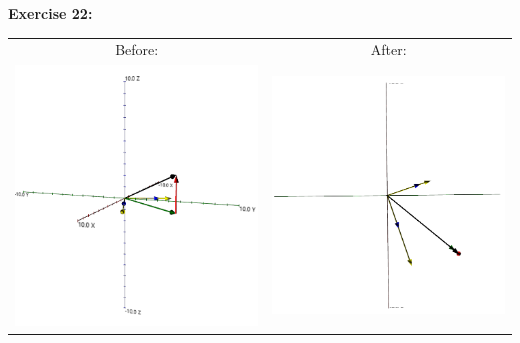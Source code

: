 \documentclass[10pt]{article}
\begin{document}
	\textbf{\large Exercise 22:}\\
	\begin{tabular}{cc}
		Before: & After:\\
		\includegraphics[scale=.4]{module7_exercise22_a} & \includegraphics[scale=.4]{module7_exercise22_b}
	\end{tabular}
	
\end{document}
